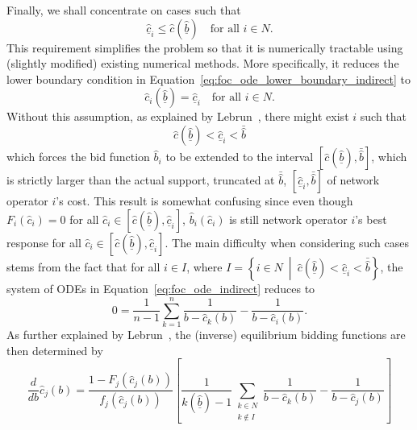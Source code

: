 Finally, we shall concentrate on cases such that
\begin{equation*}
  \underline{\hat{c}}_i \leq \hat{c}(\underline{\hat{b}}) \quad\text{for all } i\in N.
\end{equation*}
This requirement simplifies the problem so that it is numerically tractable using (slightly modified) existing numerical methods. More specifically, it reduces the lower boundary condition in Equation~\eqref{eq:foc_ode_lower_boundary_indirect} to
\begin{equation}
  \label{eq:foc_ode_lower_boundary_reduced_indirect}
  \hat{c}_i(\underline{\hat{b}}) = \underline{\hat{c}}_i \quad\text{for all } i\in N.
\end{equation}
Without this assumption, as explained by Lebrun~\cite{Lebrun2006}, there might exist $i$ such that
\begin{equation*}
  \hat{c}(\underline{\hat{b}}) < \underline{\hat{c}}_i < \bar{\hat{b}}
\end{equation*}
which forces the bid function $\hat{b}_i$ to be extended to the interval $[\hat{c}(\underline{\hat{b}}), \bar{\hat{b}}]$, which is strictly larger than the actual support, truncated at $\bar{\hat{b}}$, $[\underline{\hat{c}}_i, \bar{\hat{b}}]$ of network operator $i$'s cost. This result is somewhat confusing since even though $F_i(\hat{c}_i) = 0$ for all $\hat{c}_i\in [\hat{c}(\underline{\hat{b}}), \underline{\hat{c}}_i]$, $\hat{b}_i(\hat{c}_i)$ is still network operator $i$'s best response for all $\hat{c}_i\in [\hat{c}(\underline{\hat{b}}), \underline{\hat{c}}_i]$. The main difficulty when considering such cases stems from the fact that for all $i\in I$, where $I = \left\{i\in N \:\middle\vert\: \hat{c}(\underline{\hat{b}}) < \underline{\hat{c}}_i < \bar{\hat{b}} \right\}$, the system of ODEs in Equation~\eqref{eq:foc_ode_indirect} reduces to
\begin{equation}
  \label{eq:foc_reduced_indirect}
  0 = \frac{1}{n-1}\sum_{k=1}^{n}\frac{1}{b - \hat{c}_k(b)} - \frac{1}{b - \hat{c}_i(b)}.
\end{equation}
As further explained by Lebrun~\cite{Lebrun2006}, the (inverse) equilibrium bidding functions are then determined by
\begin{equation}
  \label{eq:foc_ode_reduced_indirect}
  \frac{d}{db}\hat{c}_j(b) = \frac{1 - F_j(\hat{c}_j(b))}{f_j(\hat{c}_j(b))} \left[ \frac{1}{k(\underline{\hat{b}}) - 1}\sum_{\substack{k\in N\\ k\not\in I}}\frac{1}{b - \hat{c}_k(b)} - \frac{1}{b - \hat{c}_j(b)}\right]
\end{equation}
